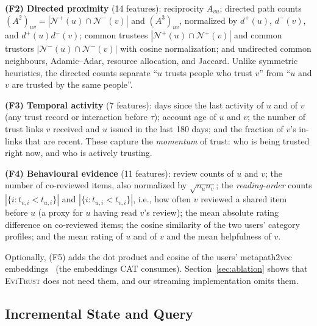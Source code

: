\documentclass[conference]{IEEEtran}
\newcommand{\evi}{\textsc{EviTrust}}
\begin{document}
\textbf{(F2) Directed proximity} (14 features): reciprocity $A_{vu}$; directed path counts $(A^2)_{uv}=|\mathcal{N}^{+}(u)\cap\mathcal{N}^{-}(v)|$ and $(A^3)_{uv}$, normalized by $d^{+}(u)$, $d^{-}(v)$, and $d^{+}(u)d^{-}(v)$; common trustees $|\mathcal{N}^{+}(u)\cap\mathcal{N}^{+}(v)|$ and common trustors $|\mathcal{N}^{-}(u)\cap\mathcal{N}^{-}(v)|$ with cosine normalization; and undirected common neighbours, Adamic--Adar, resource allocation, and Jaccard. Unlike symmetric heuristics, the directed counts separate ``$u$ trusts people who trust $v$'' from ``$u$ and $v$ are trusted by the same people''.

\textbf{(F3) Temporal activity} (7 features): days since the last activity of $u$ and of $v$ (any trust record or interaction before $\tau$); account age of $u$ and $v$; the number of trust links $v$ received and $u$ issued in the last 180 days; and the fraction of $v$'s in-links that are recent. These capture the \emph{momentum} of trust: who is being trusted right now, and who is actively trusting.

\textbf{(F4) Behavioural evidence} (11 features): review counts of $u$ and $v$; the number of co-reviewed items, also normalized by $\sqrt{n_u n_v}$; the \emph{reading-order} counts $|\{i: t_{v,i} < t_{u,i}\}|$ and $|\{i: t_{u,i} < t_{v,i}\}|$, i.e., how often $v$ reviewed a shared item before $u$ (a proxy for $u$ having read $v$'s review); the mean absolute rating difference on co-reviewed items; the cosine similarity of the two users' category profiles; and the mean rating of $u$ and of $v$ and the mean helpfulness of $v$.

Optionally, (F5) adds the dot product and cosine of the users' metapath2vec embeddings~\cite{dong2017metapath2vec} (the embeddings CAT consumes). Section~\ref{sec:ablation} shows that \evi{} does not need them, and our streaming implementation omits them.

\subsection{Incremental State and Query}
\label{sec:stream}
\end{document}
